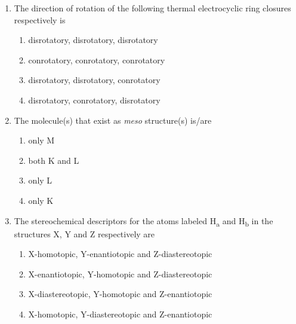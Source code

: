 \documentclass[journal,12pt,onecolumn]{IEEEtran}
\theoremstyle{remark}
\begin{document}
\begin{enumerate}
\item  The direction of rotation of the following thermal electrocyclic ring closures respectively is \hfill{}




\begin{multicols}{2}
\begin{enumerate}
     \item   disrotatory, disrotatory, disrotatory
     \item   conrotatory, conrotatory, conrotatory
     \item   disrotatory, disrotatory, conrotatory
     \item   disrotatory, conrotatory, disrotatory
\end{enumerate}
\end{multicols}

 


\item  The molecule(s) that exist as \textit{meso} structure(s) is/are \hfill{}





\begin{multicols}{2}
\begin{enumerate}
   \item   only M
   \item   both K and L
   \item   only L
   \item   only K
\end{enumerate}
\end{multicols}

 

\item  The stereochemical descriptors for the atoms labeled H\textsubscript{a} and H\textsubscript{b} in the structures X, Y and Z respectively are \hfill{}


\begin{multicols}{2}
\begin{enumerate}
\item X-homotopic, Y-enantiotopic and Z-diastereotopic
\item X-enantiotopic, Y-homotopic and Z-diastereotopic
\item X-diastereotopic, Y-homotopic and Z-enantiotopic
\item X-homotopic, Y-diastereotopic and Z-enantiotopic
\end{enumerate}
\end{multicols}
 


\end{enumerate}
\end{document}
